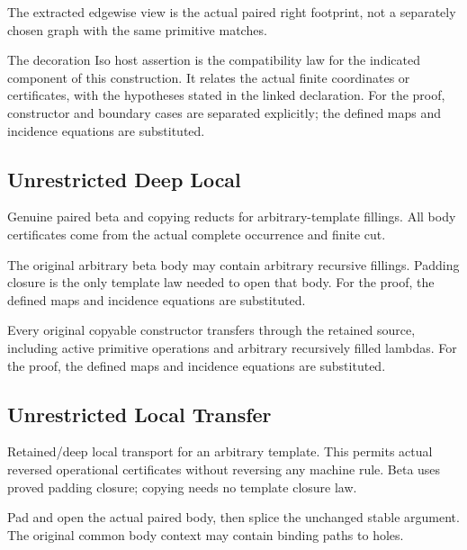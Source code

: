 The extracted edgewise view is the actual paired right footprint, not a separately chosen graph with the same primitive matches.
\par{}

The decoration Iso host assertion is the compatibility law for the indicated component of this construction. It relates the actual finite coordinates or certificates, with the hypotheses stated in the linked declaration.
For the proof, constructor and boundary cases are separated explicitly; the defined maps and incidence equations are substituted.
\par{}

\subsection{Unrestricted Deep Local}
Genuine paired beta and copying reducts for arbitrary-template fillings. All body certificates come from the actual complete occurrence and finite cut.

The original arbitrary beta body may contain arbitrary recursive fillings. Padding closure is the only template law needed to open that body.
For the proof, the defined maps and incidence equations are substituted.
\par{}

Every original copyable constructor transfers through the retained source, including active primitive operations and arbitrary recursively filled lambdas.
For the proof, the defined maps and incidence equations are substituted.
\par{}

\subsection{Unrestricted Local Transfer}
Retained/deep local transport for an arbitrary template. This permits actual reversed operational certificates without reversing any machine rule. Beta uses proved padding closure; copying needs no template closure law.

Pad and open the actual paired body, then splice the unchanged stable argument. The original common body context may contain binding paths to holes.
\par{}

